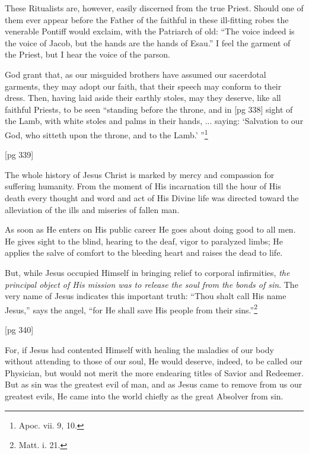 These Ritualists are, however, easily discerned
from the true Priest. Should one of them ever
appear before the Father of the faithful in these
ill-fitting robes the venerable Pontiff would exclaim,
with the Patriarch of old: “The voice indeed
is the voice of Jacob, but the hands are the
hands of Esau.” I feel the garment of the Priest,
but I hear the voice of the parson.

God grant that, as our misguided brothers have
assumed our sacerdotal garments, they may adopt
our faith, that their speech may conform to their
dress. Then, having laid aside their earthly
stoles, may they deserve, like all faithful Priests,
to be seen “standing before the throne, and in
[pg 338]
sight of the Lamb, with white stoles and palms in
their hands, ... saying: ‘Salvation to our God,
who sitteth upon the throne, and to the Lamb.’ ”\footnote{Apoc.
vii. 9, 10.}

[pg 339]



The whole history of Jesus Christ is marked
by mercy and compassion for suffering humanity.
From the moment of His incarnation
till the hour of His death every thought and
word and act of His Divine life was directed toward
the alleviation of the ills and miseries of
fallen man.

As soon as He enters on His public career He
goes about doing good to all men. He gives sight
to the blind, hearing to the deaf, vigor to paralyzed
limbs; He applies the salve of comfort to the
bleeding heart and raises the dead to life.

But, while Jesus occupied Himself in bringing
relief to corporal infirmities, \emph{the principal object
of His mission was to release the soul from the
bonds of sin}. The very name of Jesus indicates
this important truth: “Thou shalt call His name
Jesus,” says the angel, “for He shall save His
people from their sins.”\footnote{Matt. i. 21.}

[pg 340]

For, if Jesus had contented Himself with healing
the maladies of our body without attending to
those of our soul, He would deserve, indeed, to be
called our Physician, but would not merit the more
endearing titles of Savior and Redeemer. But as
sin was the greatest evil of man, and as Jesus
came to remove from us our greatest evils, He
came into the world chiefly as the great Absolver
from sin.

